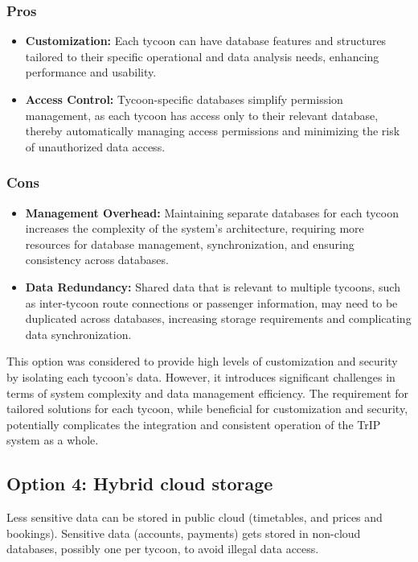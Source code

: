 \subsubsection*{Pros}
\begin{itemize}
    \item \textbf{Customization:} Each tycoon can have database features and structures tailored to their specific operational and data analysis needs, enhancing performance and usability.
    \item \textbf{Access Control:} Tycoon-specific databases simplify permission management, as each tycoon has access only to their relevant database, thereby automatically managing access permissions and minimizing the risk of unauthorized data access.
\end{itemize}

\subsubsection*{Cons}
\begin{itemize}
    \item \textbf{Management Overhead:} Maintaining separate databases for each tycoon increases the complexity of the system's architecture, requiring more resources for database management, synchronization, and ensuring consistency across databases.
    \item \textbf{Data Redundancy:} Shared data that is relevant to multiple tycoons, such as inter-tycoon route connections or passenger information, may need to be duplicated across databases, increasing storage requirements and complicating data synchronization.
\end{itemize}

This option was considered to provide high levels of customization and security by isolating each tycoon's data. However, it introduces significant challenges in terms of system complexity and data management efficiency. The requirement for tailored solutions for each tycoon, while beneficial for customization and security, potentially complicates the integration and consistent operation of the TrIP system as a whole.


\subsection*{Option 4: Hybrid cloud storage}
Less sensitive data can be stored in public cloud (timetables, and prices and bookings). Sensitive data (accounts, payments) gets stored in non-cloud databases, possibly one per tycoon, to avoid illegal data access.

